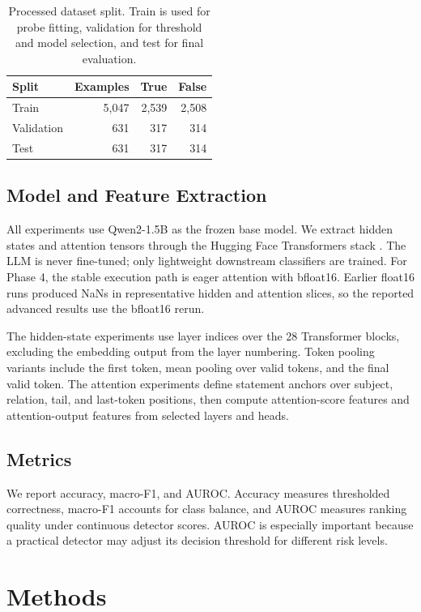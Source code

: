 \documentclass[11pt]{article}
\begin{document}
\begin{table}[t]
\centering
\small
\begin{tabular}{lrrr}
\toprule
Split & Examples & True & False \\
\midrule
Train & 5,047 & 2,539 & 2,508 \\
Validation & 631 & 317 & 314 \\
Test & 631 & 317 & 314 \\
\bottomrule
\end{tabular}
\caption{Processed dataset split. Train is used for probe fitting, validation for threshold and model selection, and test for final evaluation.}
\label{tab:dataset}
\end{table}

\subsection{Model and Feature Extraction}

All experiments use Qwen2-1.5B as the frozen base model. We extract hidden states and attention tensors through the Hugging Face Transformers stack \citep{wolf2020transformers}. The LLM is never fine-tuned; only lightweight downstream classifiers are trained. For Phase 4, the stable execution path is eager attention with bfloat16. Earlier float16 runs produced NaNs in representative hidden and attention slices, so the reported advanced results use the bfloat16 rerun.

The hidden-state experiments use layer indices over the 28 Transformer blocks, excluding the embedding output from the layer numbering. Token pooling variants include the first token, mean pooling over valid tokens, and the final valid token. The attention experiments define statement anchors over subject, relation, tail, and last-token positions, then compute attention-score features and attention-output features from selected layers and heads.

\subsection{Metrics}

We report accuracy, macro-F1, and AUROC. Accuracy measures thresholded correctness, macro-F1 accounts for class balance, and AUROC measures ranking quality under continuous detector scores. AUROC is especially important because a practical detector may adjust its decision threshold for different risk levels.

\section{Methods}
\end{document}

